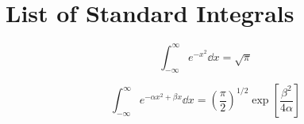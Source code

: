 \label{appendix1.Integrals}

\ifpdf
\graphicspath{{Appendix1/figs/}}
\else
\graphicspath{{Appendix1/figs/}}
\fi

\section{List of Standard Integrals}
\begin{equation}
\int_{-\infty}^{\infty} e^{-x^2} \dd{x} = \sqrt{\pi} 
\label{appendix1.eqn1}
\end{equation}

\begin{equation}
\int_{-\infty}^{\infty} e^{-\alpha x^2 + \beta x} \dd{x} = \left(\frac{\pi}{2}\right)^{1/2} \exp\left[\frac{\beta^2}{4\alpha}\right]
\label{appendix1.eqn2}
\end{equation}

